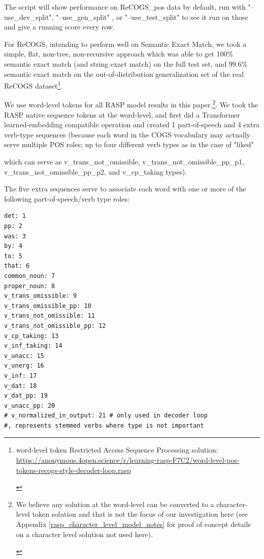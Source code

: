 \documentclass[11pt]{article}
\begin{document}
The script will show performance on \cite{Wu2023} ReCOGS\_pos data by default, run with "--use\_dev\_split", "--use\_gen\_split" , or "--use\_test\_split" to see it run on those and give a running score every row.

For ReCOGS, intending to perform well on Semantic Exact Match, we took a simple, flat, non-tree, non-recursive approach which was able to get 100\% semantic exact match (and string exact match) on the full test set, and 99.6\% semantic exact match on the out-of-distribution generalization set of the real ReCOGS dataset\footnote{\begin{footnotesize}word-level token Restricted Access Sequence Processing solution: \href{https://anonymous.4open.science/r/learning-rasp-F7C2/word-level-pos-tokens-recogs-style-decoder-loop.rasp}{https://anonymous.4open.science/r/learning-rasp-F7C2/word-level-pos-tokens-recogs-style-decoder-loop.rasp} \end{footnotesize}}.

We use word-level tokens for all RASP model results in this paper.\footnote{\begin{footnotesize}We believe any solution at the word-level can be converted to a character-level token solution and that is not the focus of our investigation here (see Appendix \ref{rasp_character_level_model_notes} for proof of concept details on a character level solution not used here).\end{footnotesize}}. We took the RASP native sequence tokens at the word-level, and first did a Transformer learned-embedding compatible operation and created 1 part-of-speech and 4 extra verb-type sequences (because each word in the COGS vocabulary may actually serve multiple POS roles; up to four different verb types as in the case of "liked" 

which can serve as v\_trans\_not\_omissible, v\_trans\_not\_omissible\_pp\_p1, v\_trans\_not\_omissible\_pp\_p2, and v\_cp\_taking types). 

The five extra sequences serve to associate each word with one or more of the following part-of-speech/verb type roles:
\begin{tiny}
\begin{verbatim}
det: 1
pp: 2
was: 3
by: 4
to: 5
that: 6
common_noun: 7
proper_noun: 8
v_trans_omissible: 9
v_trans_omissible_pp: 10
v_trans_not_omissible: 11
v_trans_not_omissible_pp: 12
v_cp_taking: 13
v_inf_taking: 14
v_unacc: 15
v_unerg: 16
v_inf: 17
v_dat: 18
v_dat_pp: 19
v_unacc_pp: 20
# v_normalized_in_output: 21 # only used in decoder loop 
#, represents stemmed verbs where type is not important
\end{verbatim}
\end{tiny}
\end{document}
